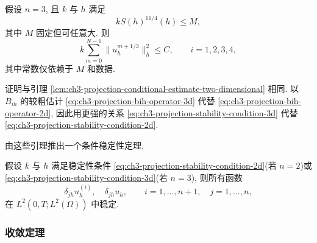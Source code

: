 \begin{Lemma}
\label{lem:ch3-projection-conditional-estimate-three-dimensional}
假设 $n=3$, 且 $k$ 与 $h$ 满足
\begin{equation}
kS(h)^{11/4}(h)\leq M,
\label{eq:ch3-projection-stability-condition-3d}
\end{equation}
其中 $M$ 固定但可任意大. 则
\begin{equation}
k\sum_{m=0}^{N-1}\lVert u_h^{m+1/3}\rVert_h^2
\leq C,\qquad i=1,2,3,4,
\label{eq:ch3-projection-conditional-bound-3d}
\end{equation}
其中常数仅依赖于 $M$ 和数据.
\end{Lemma}

\begin{Proof}
证明与引理 \ref{lem:ch3-projection-conditional-estimate-two-dimensional} 相同. 以 $B_{ih}$ 的较粗估计 \eqref{eq:ch3-projection-bih-operator-3d} 代替 \eqref{eq:ch3-projection-bih-operator-2d}, 因此用更强的关系 \eqref{eq:ch3-projection-stability-condition-3d} 代替 \eqref{eq:ch3-projection-stability-condition-2d}.
\end{Proof}

由这些引理推出一个条件稳定性定理.

\begin{Theorem}
\label{thm:ch3-projection-conditional-stability}
假设 $k$ 与 $h$ 满足稳定性条件 \eqref{eq:ch3-projection-stability-condition-2d}(若 $n=2$)或 \eqref{eq:ch3-projection-stability-condition-3d}(若 $n=3$), 则所有函数
\[
\delta_{jh}u_h^{(i)},\quad\delta_{jh}u_h,
\qquad i=1,\ldots,n+1,\quad j=1,\ldots,n,
\]
在 $L^2(0,T;L^2(\Omega))$ 中稳定.
\end{Theorem}

\subsubsection{收敛定理}
\label{subsubsec:ch3-projection-discrete-convergence-theorems}

